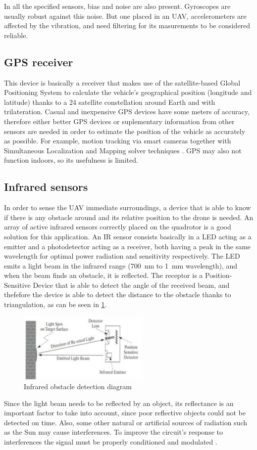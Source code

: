 \documentclass[journal]{IEEEtran}
\begin{document}
		In all the specified sensors, bias and noise are also present. Gyroscopes are usually robust against this noise. But one placed in an UAV, accelerometers are affected by the vibration, and need filtering for its masurements to be considered reliable.
		
		\subsection{GPS receiver}
		This device is basically a receiver that makes use of the satellite-based Global Positioning System to calculate the vehicle's geographical position (longitude and latitude) thanks to a 24 satellite constellation around Earth and with trilateration. Casual and inexpensive GPS devices have some meters of accuracy, therefore either better GPS devices or suplementary information from other sensors are needed in order to estimate the position of the vehicle as accurately as possible. For example, motion tracking via smart cameras together with Simultaneous Localization and Mapping solver techniques \cite{modelling_control_mahony}. GPS may also not function indoors, so its usefulness is limited.
		
		\subsection{Infrared sensors}
		In order to sense the UAV immediate surroundings, a device that is able to know if there is any obstacle around and its relative position to the drone is needed. An array of active infrared sensors correctly placed on the quadrotor is a good solution for this application. An IR sensor consists basically in a LED acting as a emitter and a photodetector acting as a receiver, both having a peak in the same wavelength for optimal power radiation and sensitivity respectively. The LED emits a light beam in the infrared range (\SI{700}{\nano \meter} to \SI{1}{\milli \meter} wavelength), and when the beam finds an obstacle, it is reflected. The receptor is a Position-Sensitive Device that is able to detect the angle of the received beam, and thefefore the device is able to detect the distance to the obstacle thanks to triangulation, as can be seen in \figurename\ref{fig:ir}.
		\begin{figure}[h]
			\centering
			\includegraphics[width=2.5in]{ir}
			\caption{Infrared obstacle detection diagram}
			\label{fig:ir}
		\end{figure}
		Since the light beam needs to be reflected by an object, its reflectance is an important factor to take into account, since poor reflective objects could not be detected on time.  Also, some other natural or artificial sources of radiation such as the Sun may cause interferences. To improve the circuit's response to interferences the signal must be properly conditioned and modulated \cite{mod_control_bresciani, remotecontrol}.
		
\end{document}
